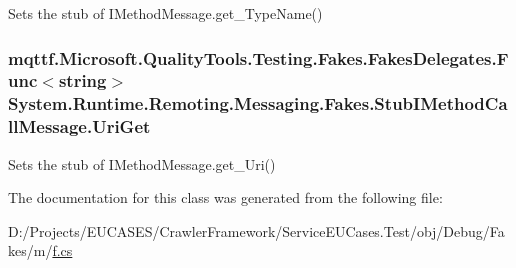 Sets the stub of I\-Method\-Message.\-get\-\_\-\-Type\-Name()

\hypertarget{class_system_1_1_runtime_1_1_remoting_1_1_messaging_1_1_fakes_1_1_stub_i_method_call_message_a2e7d3f7e5aa0bb10e7468cfa556f806e}{
\subsubsection[{Uri\-Get}]{\setlength{\rightskip}{0pt plus 5cm}mqttf.\-Microsoft.\-Quality\-Tools.\-Testing.\-Fakes.\-Fakes\-Delegates.\-Func$<$string$>$ System.\-Runtime.\-Remoting.\-Messaging.\-Fakes.\-Stub\-I\-Method\-Call\-Message.\-Uri\-Get}}\label{class_system_1_1_runtime_1_1_remoting_1_1_messaging_1_1_fakes_1_1_stub_i_method_call_message_a2e7d3f7e5aa0bb10e7468cfa556f806e}


Sets the stub of I\-Method\-Message.\-get\-\_\-\-Uri()



The documentation for this class was generated from the following file\-:\begin{DoxyCompactItemize}
\item 
D\-:/\-Projects/\-E\-U\-C\-A\-S\-E\-S/\-Crawler\-Framework/\-Service\-E\-U\-Cases.\-Test/obj/\-Debug/\-Fakes/m/\hyperlink{m_2f_8cs}{f.\-cs}\end{DoxyCompactItemize}
